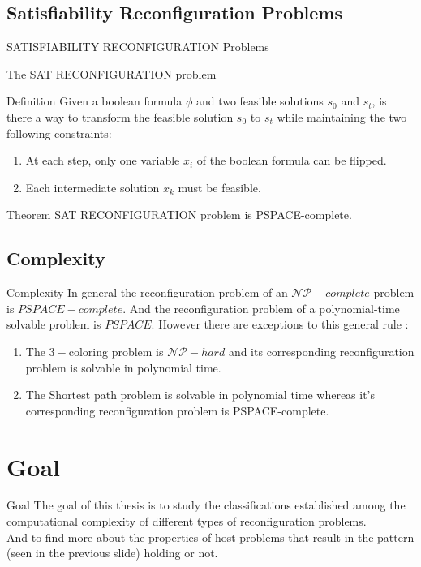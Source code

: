 \subsection{Satisfiability Reconfiguration Problems}
\begin{frame}{SATISFIABILITY RECONFIGURATION Problems}
  \begin{block}{The SAT RECONFIGURATION problem}
      \begin{block}{Definition}
      Given a boolean formula $\phi$ and two feasible solutions $s_0$ and $s_t$, is there a way to transform the feasible solution $s_0$ to $s_t$ while maintaining the two following constraints:
      \pause
      \begin{enumerate}
          \item At each step, only one variable $x_i$ of the boolean formula can be flipped.
          \item Each intermediate solution $x_k$ must be feasible.
      \end{enumerate}
      \end{block}

      \begin{block}{Theorem}
      SAT RECONFIGURATION problem is PSPACE-complete.
      \end{block}

  \end{block}
\end{frame}

\subsection{Complexity}
\begin{frame}{Complexity}
In general the reconfiguration problem of an $\mathcal{NP-}complete$ problem is $PSPACE-complete$.
And the reconfiguration problem of a polynomial-time solvable problem is $PSPACE$. However there are exceptions to this general rule :
\begin{enumerate}
    \item The $3-$coloring problem is $\mathcal{NP-}hard$ and its corresponding reconfiguration problem is solvable in polynomial time.
    \item The Shortest path problem is solvable in polynomial time whereas it's corresponding reconfiguration problem is PSPACE-complete.
\end{enumerate}
\end{frame}

\section{Goal}
\begin{frame}{Goal}
The goal of this thesis is to study the classifications established among the computational complexity of different
types of reconfiguration problems. \\
And to find more about the properties of host problems that result in the pattern (seen in the previous slide) holding or not.
\end{frame}

